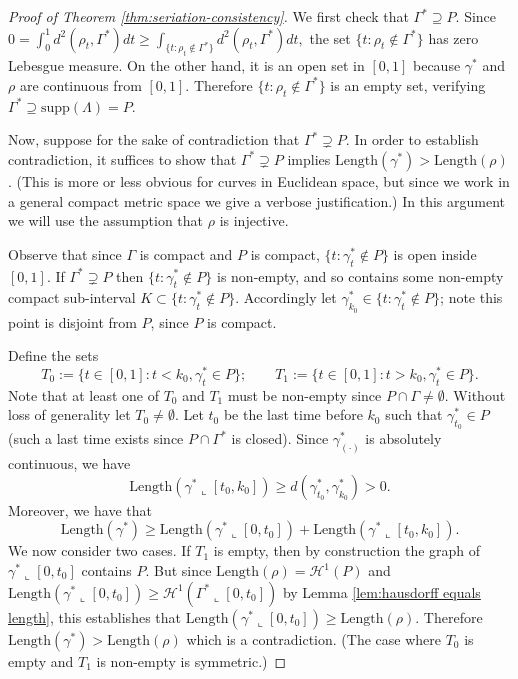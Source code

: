 \documentclass[aos, preprint]{imsart}
\theoremstyle{plain}
\theoremstyle{remark}
\begin{document}
\begin{appendix}
\begin{proof}[Proof of Theorem \ref{thm:seriation-consistency}]
 We first check that $\Gamma^*\supseteq P$. Since $0=\int_{0}^{1}d^{2}(\rho_{t},\Gamma^*)dt\geq\int_{\{t:\rho_{t}\notin\Gamma^*\}}d^{2}(\rho_{t},\Gamma^*)dt,$ the set  $\{t:\rho_{t}\notin\Gamma^*\}$ has zero Lebesgue measure. On the other hand, it is  an open set in $[0,1]$ because $\gamma^*$ and $\rho$ are continuous from $[0,1]$. Therefore $\{t:\rho_{t}\notin\Gamma^*\}$  is an empty set, verifying   $\Gamma^*\supseteq \text{supp}(\Lambda)=P$.



Now, suppose for the sake of contradiction that $\Gamma^*\supsetneq P$.
In order to establish contradiction, it suffices to show that $\Gamma^*\supsetneq P$
implies $\text{Length}(\gamma^*)>\text{Length}(\rho)$. (This is more or less obvious for curves in Euclidean space, but since we work in a general compact metric space we give a verbose justification.) In this argument
we will use the assumption that $\rho$ is injective.

Observe that since $\Gamma$ is compact and $P$ is compact, $\{t:\gamma^*_{t}\notin P\}$
is open inside $[0,1]$. If $\Gamma^* \supsetneq P$ then $\{t:\gamma^*_{t}\notin P\}$ is non-empty, and so contains some
non-empty compact sub-interval $K\subset\{t:\gamma^*_{t}\notin P\}$.
Accordingly let $\gamma^*_{k_{0}} \in \{t:\gamma^*_{t}\notin P\}$; note this point is disjoint from $P$, since
$P$ is compact.

Define the sets
\[
T_{0}:=\{t\in[0,1]:t<k_{0},\gamma^*_{t}\in P\};\qquad
T_{1}:=\{t\in[0,1]:t>k_{0},\gamma^*_{t}\in P\}.
\]
Note that at least one of $T_{0}$ and $T_{1}$ must be non-empty
since $P\cap\Gamma\neq\emptyset$. Without loss of generality let
$T_{0}\neq\emptyset$. Let $t_{0}$ be the last time before $k_{0}$
such that $\gamma^*_{t_{0}}\in P$ (such a last time exists since $P\cap\Gamma^*$
is closed). Since $\gamma^*_{(\cdot)}$ is absolutely continuous, we
have
\[
\text{Length}(\gamma^*\llcorner[t_{0},k_{0}])\geq d(\gamma^*_{t_{0}},\gamma^*_{k_{0}})>0.
\]
Moreover, we have that
\[
\text{Length}(\gamma^*)\geq\text{Length}(\gamma^*\llcorner[0,t_{0}])+\text{Length}(\gamma^*\llcorner[t_{0},k_{0}]).
\]
We now consider two cases. If $T_{1}$ is empty, then by construction
the graph of $\gamma^*\llcorner[0,t_{0}]$ contains $P$. But since
$\text{Length}(\rho)=\mathcal{H}^{1}(P)$ and $\text{Length}(\gamma^*\llcorner[0,t_{0}])\geq\mathcal{H}^{1}(\Gamma^*\llcorner[0,t_{0}])$ by Lemma \ref{lem:hausdorff equals length},
this establishes that $\text{Length}(\gamma^*\llcorner[0,t_{0}])\geq\text{Length}(\rho)$.
Therefore $\text{Length}(\gamma^*)>\text{Length}(\rho)$ which is a
contradiction. (The case where $T_{0}$ is empty and $T_{1}$ is non-empty
is symmetric.)


\end{proof}
\end{appendix}
\end{document}
